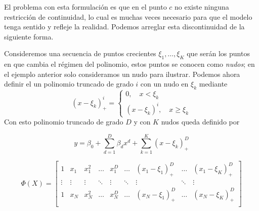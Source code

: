 El problema con esta formulación es que en el punto $c$ no existe ninguna restricción de continuidad, lo cual es muchas veces necesario para que el modelo tenga sentido y refleje la realidad. Podemos arreglar esta discontinuidad de la siguiente forma.

Consideremos una secuencia de puntos crecientes $\xi_1,\ldots,\xi_K$ que serán los puntos en que cambia el régimen del polinomio, estos puntos se conocen como \emph{nudos}; en el ejemplo anterior solo consideramos un nudo para ilustrar. Podemos ahora definir el un polinomio truncado de grado $i$ con un nudo en $\xi_k$ mediante
\begin{equation}
    (x-\xi_k)_+^i = \left\{\begin{matrix}
    0,\quad x < \xi_k\\
    (x-\xi_k)^i,\quad x \geq \xi_k
    \end{matrix}\right.
\end{equation}
Con esto polinomio truncado de grado $D$ y con $K$ nudos queda definido por
    
    \begin{equation}
        y = \beta_0 + \sum_{d=1}^D\beta_dx^d+\sum_{k=1}^K(x-\xi_k)_+^D
    \end{equation}
    
    \begin{equation}
        \Phi(X) = \left[ \begin{matrix} 1 & x_1 & x_1^2 & \ldots & x_1^D & \ldots & (x_1-\xi_1)_+^D & \ldots & (x_1-\xi_K)_+^D \\
        \vdots & \vdots & \vdots & \ddots & \vdots & \ddots & \vdots & \ddots & \vdots\\
        1 & x_N & x_N^2 & \ldots & x_N^D & \ldots & (x_N-\xi_1)_+^D & \ldots & (x_N-\xi_K)_+^D \\
        \end{matrix} \right]
    \end{equation}

\fi


